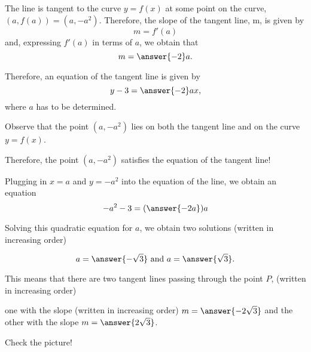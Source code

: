 \documentclass{ximera}
\begin{document}
\begin{exercise}
\begin{image}
\end{image}

 The line is tangent to the curve $y=f(x)$ at some point on the curve,  $(a,f(a))=(a,-a^2)$.  Therefore, the slope of the tangent line, m, is given by
\[
m =f'(a)
\]
and, expressing $f'(a)$ in terms of $a$, we obtain that
\[
 m= \answer{-2}a.\\
 \]




Therefore, an equation of the tangent line  is given by
\[
y-3=\answer{-2}ax,
\]
where $a$ has to be determined.



Observe that the point $(a,-a^2)$ lies on both the tangent line and on the curve $y=f(x)$. 

Therefore, the point $(a,-a^2)$ satisfies the equation of the tangent line!


Plugging in $x=a$ and $y=-a^2$ into the equation of the line, we obtain an equation
\[
-a^2-3=(\answer{-2a})a
\]



Solving this quadratic equation for $a$, we obtain  two solutions (written in increasing order)


\[
a=\answer{-\sqrt{3}}\text {   and    } a=\answer{\sqrt{3}}.
\]

This means  that there are two tangent lines passing through the point $P$, (written in increasing order)

 one with the slope (written in increasing order) $m=\answer{-2\sqrt{3}}$ and the other with the slope $m=\answer{2\sqrt{3}}$.
 
Check the picture!
\begin{image}
\end{image}
\end{exercise}
\end{document}
